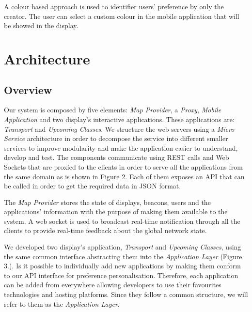 \documentclass[]{usiinfbachelorproject}
\begin{document}
A colour based approach is used to identifier users' preference by only the creator. The user can select a custom colour in the mobile application that will be showed in the display.

\section{Architecture}
\subsection{Overview}
Our system is composed by five elements: \emph{Map Provider}, a \emph{Proxy}, \emph{Mobile Application} and two display's interactive applications. These applications are: \emph{Transport} and \emph{Upcoming Classes}. We structure the web servers using a \emph{Micro Service} architecture in order to decompose the service into different smaller services to improve modularity and make the application easier to understand, develop and test. The components communicate using REST calls and Web Sockets that are proxied to the clients in order to serve all the applications from the same domain as is shown in Figure 2. Each of them exposes an API that can be called in order to get the required data in JSON format.

The \emph{Map Provider} stores the state of displays, beacons, users and the applications' information with the purpose of making them available to the system. A web socket is used to broadcast real-time notification through all the clients to provide real-time feedback about the global network state.

We developed two display's application, \emph{Transport} and \emph{Upcoming Classes}, using the same common interface abstracting them into the \emph{Application Layer} (Figure 3.). Is it possible to individually add new applications by making them conform to our API interface for preference personalisation. Therefore, each application can be added from everywhere allowing developers to use their favourites technologies and hosting platforms.
Since they follow a common structure, we will refer to them as the \emph{Application Layer}.
\end{document}
